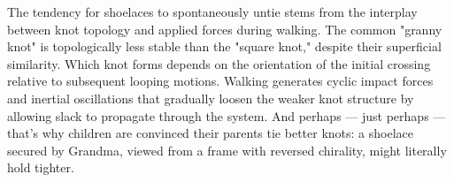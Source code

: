 The tendency for shoelaces to spontaneously untie stems from the interplay between knot topology and applied forces during walking. The common "granny knot" is topologically less stable than the "square knot," despite their superficial similarity. Which knot forms depends on the orientation of the initial crossing relative to subsequent looping motions. Walking generates cyclic impact forces and inertial oscillations that gradually loosen the weaker knot structure by allowing slack to propagate through the system. And perhaps — just perhaps — that's why children are convinced their parents tie better knots: a shoelace secured by Grandma, viewed from a frame with reversed chirality, might literally hold tighter.
